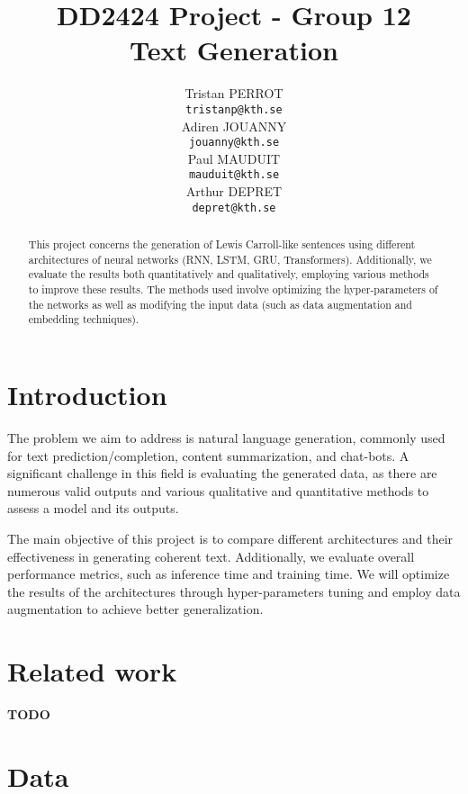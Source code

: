 \documentclass{article}
\title{DD2424 Project - Group 12 \\ Text Generation}
\author{%
  Tristan PERROT \\
  \texttt{tristanp@kth.se} \\
  \And
  Adiren JOUANNY \\
  \texttt{jouanny@kth.se} \\
  \And
  Paul MAUDUIT \\
  \texttt{mauduit@kth.se} \\
  \And
  Arthur DEPRET \\
  \texttt{depret@kth.se} \\
}
\begin{document}
\maketitle


\begin{abstract}
  This project concerns the generation of Lewis Carroll-like sentences using different architectures of neural networks (RNN, LSTM, GRU, Transformers). Additionally, we evaluate the results both quantitatively and qualitatively, employing various methods to improve these results. The methods used involve optimizing the hyper-parameters of the networks as well as modifying the input data (such as data augmentation and embedding techniques).
\end{abstract}

\section{Introduction}

The problem we aim to address is natural language generation, commonly used for text prediction/completion, content summarization, and chat-bots. A significant challenge in this field is evaluating the generated data, as there are numerous valid outputs and various qualitative and quantitative methods to assess a model and its outputs.

The main objective of this project is to compare different architectures and their effectiveness in generating coherent text. Additionally, we evaluate overall performance metrics, such as inference time and training time. We will optimize the results of the architectures through hyper-parameters tuning and employ data augmentation to achieve better generalization.

\section{Related work}

\textbf{TODO}

\section{Data}
\end{document}
